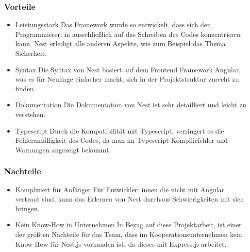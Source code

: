 \subsubsection{Vorteile}
\begin{itemize}
    \item Leistungsstark
    \newline
    Das Framework wurde so entwickelt, dass sich der Programmierer: in ausschließlich auf das Schreiben des Codes konzentrieren kann. Nest erledigt alle anderen Aspekte, wie zum Beispiel das Thema Sicherheit.
    \item Syntax
    \newline
    Die Syntax von Nest basiert auf dem Frontend Framework Angular, was es für Neulinge einfacher macht, sich in der Projektstruktur zurecht zu finden.
    \item Dokumentation
    \newline
    Die Dokumentation von Nest ist sehr detailliert und leicht zu verstehen.
    \item Typescript
    \newline
    Durch die Kompatibilität mit Typescript, verringert es die Fehleranfälligkeit des Codes, da man im Typescript Kompiliefehler und Warnungen angezeigt bekommt.
\end{itemize}

\subsubsection{Nachteile}
\begin{itemize}
    \item Kompliziert für Anfänger
    \newline
    Für Entwickler: innen die nicht mit Angular vertraut sind, kann das Erlernen von Nest durchaus Schwierigkeiten mit sich bringen.
    \item Kein Know-How in Unternehmen
    \newline
    In Bezug auf diese Projektarbeit, ist einer der größten Nachteile für das Team, dass im Kooperationsunternehmen kein Know-How für Nest.js vorhanden ist, da dieses mit Express.js arbeitet.
\end{itemize}
\cite{Nest_js_Pros_Cons}
